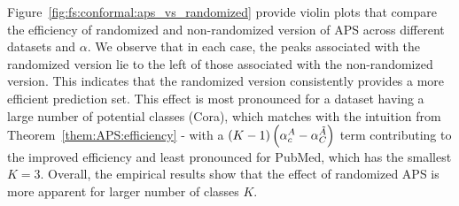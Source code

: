 Figure~\ref{fig:fs:conformal:aps_vs_randomized} %
provide violin plots that compare the efficiency of randomized and non-randomized version of APS across different datasets and $\alpha$.
We observe that in each case, the peaks associated with the randomized version lie to the left of those associated with the non-randomized version.
This indicates that the randomized version consistently provides a more efficient prediction set.
This effect is most pronounced for a dataset having a large number of potential classes (Cora), which matches with the intuition from Theorem~\ref{them:APS:efficiency} - with a $(K-1)\left(\alpha_c^{A} - \alpha_C^{\Tilde{A}}\right)$ term contributing to the improved efficiency and least pronounced for PubMed, which has the smallest $K=3$.
Overall, the empirical results show that the effect of randomized APS is more apparent for larger number of classes $K$.

